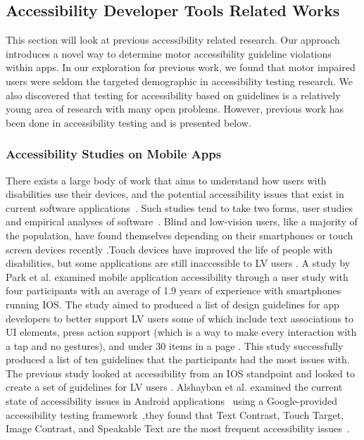 \subsection{Accessibility Developer Tools Related Works}

This section will look at previous accessibility related research. Our approach introduces a novel way to determine motor accessibility guideline violations within apps. In our exploration for previous work, we found that motor impaired users were seldom the targeted demographic in accessibility testing research. We also discovered that testing for accessibility based on guidelines is a relatively young area of research with many open problems. However, previous work has been done in accessibility testing and is presented below.  

\subsubsection{Accessibility Studies on Mobile Apps}

There exists a large body of work that aims to understand how users with disabilities use their devices, and the potential accessibility issues that exist in current software applications~\cite{Mchugh20,Almeida10,Yan19,Silva20,Santiago22,Mateus20,Aizpurua14,Silva19,Oh13,Montague14}. Such studies tend to take two forms, user studies~\cite{Aizpurua14,Mateus20} and empirical analyses of software~\cite{Silva20,Yan19}.
Blind and low-vision users, like a majority of the population, have found themselves depending on their smartphones or touch screen devices recently \cite{Li22}.Touch devices have improved the life of people with disabilities, but some applications are still inaccessible to LV users \cite{Park14}. 
A study by Park et al. \cite{Park14} examined mobile application accessibility through a user study with four participants with an average of 1.9 years of experience with smartphones running IOS. The study aimed to produced a list of design guidelines for app developers to better support LV users some of which include text associations to UI elements, press action support (which is a way to make every interaction with a tap and no gestures), and under 30 items in a page \cite{Park14}. This study successfully produced a list of ten guidelines that the participants had the most issues with. 
The previous study looked at accessibility from an IOS standpoint and looked to create a set of guidelines for LV users \cite{Mateus20, Alshayban20, Kim16}. Alshayban et al. \cite{Alshayban20} examined the current state of accessibility issues in Android applications~\cite{Alshayban20} using a Google-provided accessibility testing framework~\cite{GoogleAccess},they found that Text Contrast, Touch Target, Image Contrast, and Speakable Text are the most frequent accessibility issues~\cite{Alshayban20}. 

